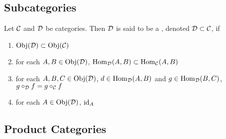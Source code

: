 \documentclass{book}
\begin{document}
\subsection{Subcategories}

\begin{defn}
	Let $\mathcal{C}$ and $\mathcal{D}$ be categories. Then $\mathcal{D}$ is said to be a , denoted $\mathcal{D} \subset \mathcal{C}$, if 
	\begin{enumerate}
		\item $\operatorname{Obj}(\mathcal{D}) \subset \operatorname{Obj}(\mathcal{C})$
		\item for each $A, B \in \operatorname{Obj}(\mathcal{D})$, $\operatorname{Hom}_{\mathcal{D}}(A,B) \subset \operatorname{Hom}_{\mathcal{C}}(A, B)$
		\item for each $A,B,C \in \operatorname{Obj}(\mathcal{D})$, $d \in \operatorname{Hom}_{\mathcal{D}}(A, B)$ and $g \in \operatorname{Hom}_{\mathcal{D}}(B, C)$, $g \circ_{\mathcal{D}} f = g \circ_{\mathcal{C}} f$
		\item for each $A \in \operatorname{Obj}(\mathcal{D})$, $\operatorname{id}_A $
	\end{enumerate}
\end{defn}




















	
	\subsection{Product Categories}
	
\end{document}
